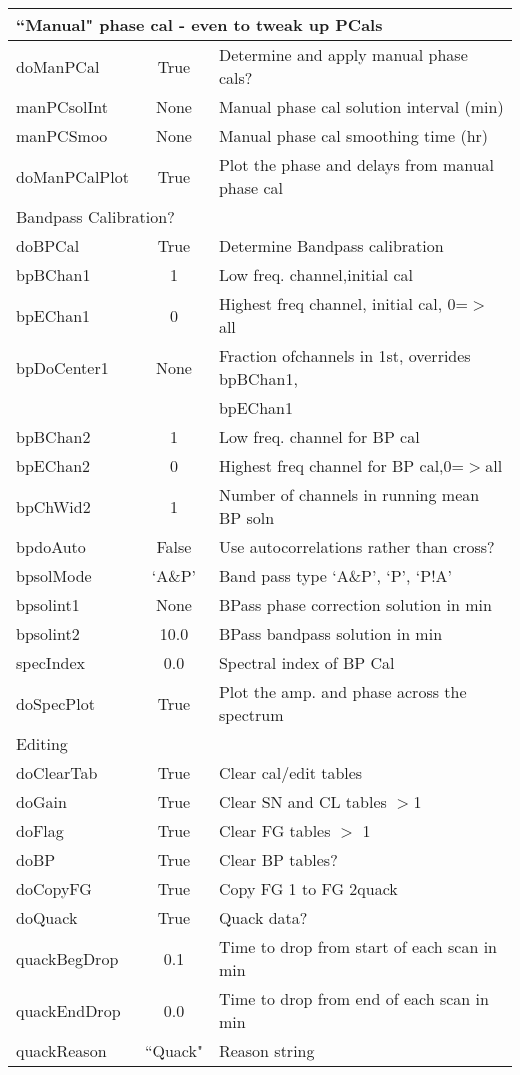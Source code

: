 \documentclass[11pt]{article}
\begin{document}
\clearpage
\begin{center}
\begin{tabular}{|l|c|l|}

\hline
\multicolumn{3}{|l|}{``Manual" phase cal - even to tweak up PCals} \\
\hline
doManPCal & True & Determine and apply manual phase cals? \\
manPCsolInt & None & Manual phase cal solution interval (min) \\
manPCSmoo & None & Manual phase cal smoothing time (hr) \\
doManPCalPlot & True & Plot the phase and delays from manual phase cal \\

\hline
\multicolumn{3}{|l|}{Bandpass Calibration?} \\
\hline
doBPCal & True & Determine Bandpass calibration \\
bpBChan1 & 1 & Low freq. channel,initial cal \\
bpEChan1 & 0 & Highest freq channel, initial cal, 0=$>$all \\
bpDoCenter1 & None & Fraction ofchannels in 1st, overrides bpBChan1, \\
 & & bpEChan1 \\
bpBChan2 & 1 & Low freq. channel for BP cal \\
bpEChan2 & 0 & Highest freq channel for BP cal,0=$>$all  \\
bpChWid2 & 1 & Number of channels in running mean BP soln \\
bpdoAuto & False & Use autocorrelations rather than cross? \\
bpsolMode & `A\&P' & Band pass type `A\&P', `P', `P!A' \\
bpsolint1 & None & BPass phase correction solution in min \\
bpsolint2 & 10.0 & BPass bandpass solution in min \\
specIndex & 0.0 & Spectral index of BP Cal \\
doSpecPlot & True & Plot the amp. and phase across the spectrum \\

\hline
\multicolumn{3}{|l|}{Editing} \\
\hline
doClearTab & True & Clear cal/edit tables \\
doGain & True & Clear SN and CL tables $>$1 \\
doFlag & True & Clear FG tables $>$ 1 \\
doBP & True & Clear BP tables? \\
doCopyFG & True & Copy FG 1 to FG 2quack \\
doQuack & True & Quack data? \\
quackBegDrop & 0.1 & Time to drop from start of each scan in min \\
quackEndDrop & 0.0 & Time to drop from end of each scan in min \\
quackReason & ``Quack" & Reason string \\


\end{tabular}
\end{center}
\end{document}
